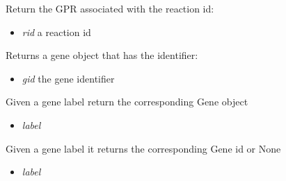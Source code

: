 \documentclass[a4paper,11pt,english]{sphinxmanual}
\begin{document}
\begin{fulllineitems}
\begin{fulllineitems}
\begin{itemize}
\end{itemize}

\end{fulllineitems}


\begin{fulllineitems}
\label{modules_doc:cbmpy.CBModel.Model.getGPRforReaction}
Return the GPR associated with the reaction id:
\begin{itemize}
\item {} 
\emph{rid} a reaction id

\end{itemize}

\end{fulllineitems}


\begin{fulllineitems}
\label{modules_doc:cbmpy.CBModel.Model.getGene}
Returns a gene object that has the identifier:
\begin{itemize}
\item {} 
\emph{gid} the gene identifier

\end{itemize}

\end{fulllineitems}


\begin{fulllineitems}
\label{modules_doc:cbmpy.CBModel.Model.getGeneByLabel}
Given a gene label return the corresponding Gene object
\begin{itemize}
\item {} 
\emph{label}

\end{itemize}

\end{fulllineitems}


\begin{fulllineitems}
\label{modules_doc:cbmpy.CBModel.Model.getGeneIdFromLabel}
Given a gene label it returns the corresponding Gene id or None
\begin{itemize}
\item {} 
\emph{label}


\end{itemize}
\end{fulllineitems}
\end{fulllineitems}
\end{document}
